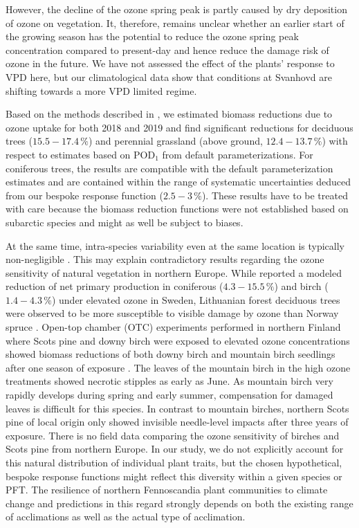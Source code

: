 \documentclass[bg, manuscript]{copernicus}
\begin{document}
However, the decline of the ozone spring peak is partly caused by dry deposition of ozone on vegetation. It, therefore, remains unclear whether an earlier start of the growing season has the potential to reduce the ozone spring peak concentration compared to present-day and hence reduce the damage risk of ozone in the future. 
We have not assessed the effect of the plants' response to VPD here, but our climatological data show that conditions at Svanhovd are shifting towards a more VPD limited regime.
 
Based on the methods described in \citet{ICP:MappingManual2017}, we estimated biomass reductions due to ozone uptake for both 2018 and 2019 and find significant reductions for deciduous trees ($15.5-17.4\,\unit{\%}$) and perennial grassland (above ground, $12.4-13.7\,\unit{\%}$) with respect to estimates based on $\mathrm{POD_1}$ from default parameterizations. For coniferous trees, the results are compatible with the default parameterization estimates and are contained within the range of systematic uncertainties deduced from our bespoke response function ($2.5-3\,\unit{\%}$). These results have to be treated with care because the biomass reduction functions were not established based on subarctic species and might as well be subject to biases.  

At the same time, intra-species variability even at the same location is typically non-negligible \citep{EP:Bassin2004,Amb:Girgzdiene2009}. This may explain contradictory results regarding the ozone sensitivity of natural vegetation in northern Europe. While \citet{FS:Subramanian2014} reported a modeled reduction of net primary production in coniferous ($4.3-15.5\,\unit{\%}$) and birch ($1.4-4.3\,\unit{\%}$) under elevated ozone in Sweden, Lithuanian forest deciduous trees were observed to be more susceptible to visible damage by ozone than Norway spruce \citep{Amb:Girgzdiene2009}. Open-top chamber (OTC) experiments performed in northern Finland where Scots pine and downy birch were exposed to elevated ozone concentrations showed biomass reductions of both downy birch and mountain birch seedlings after one season of exposure \citep{Amb:Manninen2009}. The leaves of the mountain birch in the high ozone treatments showed necrotic stipples as early as June. As mountain birch very rapidly develops during spring and early summer, compensation for damaged leaves is difficult for this species. In contrast to mountain birches, northern Scots pine of local origin only showed invisible needle-level  impacts after three years of exposure. There is no field data comparing the ozone sensitivity of birches and Scots pine from northern Europe.
In our study, we do not explicitly account for this natural distribution of individual plant traits, but the chosen hypothetical, bespoke response functions might reflect this diversity within a given species or PFT. The resilience of northern Fennoscandia plant communities to climate change and predictions in this regard strongly depends on both the existing range of acclimations as well as the actual type of acclimation. 
\end{document}

